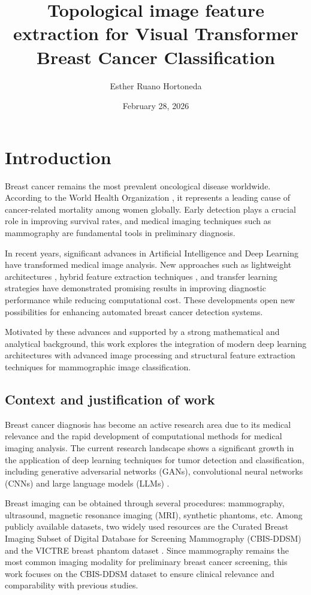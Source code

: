 \documentclass[ENG]{TFUOC}%
\title{Topological image feature extraction for Visual Transformer Breast Cancer Classification}
\author{Esther Ruano Hortoneda}
\date{February 28, 2026}
\begin{document}
\estructura

\tableofcontents

\listoffigures

\listoftables


\chapter{Introduction}

Breast cancer remains the most prevalent oncological disease worldwide. According to the World Health Organization \cite{who_cancer_2024}, it represents a leading cause of cancer-related mortality among women globally. Early detection plays a crucial role in improving survival rates, and medical imaging techniques such as mammography are fundamental tools in preliminary diagnosis.

In recent years, significant advances in Artificial Intelligence and Deep Learning have transformed medical image analysis. New approaches such as lightweight architectures \cite{lightweight}, hybrid feature extraction techniques \cite{hybrid}, and transfer learning strategies \cite{transferLearning} have demonstrated promising results in improving diagnostic performance while reducing computational cost. These developments open new possibilities for enhancing automated breast cancer detection systems.

Motivated by these advances and supported by a strong mathematical and analytical background, this work explores the integration of modern deep learning architectures with advanced image processing and structural feature extraction techniques for mammographic image classification.

\section{Context and justification of work}\label{context}

Breast cancer diagnosis has become an active research area due to its medical relevance and the rapid development of computational methods for medical imaging analysis. The current research landscape shows a significant growth in the application of deep learning techniques for tumor detection and classification, including generative adversarial networks (GANs), convolutional neural networks (CNNs) and large language models (LLMs) \cite{stateOfTheArt}. 

\sloppy Breast imaging can be obtained through several procedures: mammography, ultrasound, magnetic resonance imaging (MRI), synthetic phantoms, etc. Among publicly available datasets, two widely used resources are the Curated Breast Imaging Subset of Digital Database for Screening Mammography (CBIS-DDSM) \cite{cbis_ddsm_dataset} and the VICTRE breast phantom dataset \cite{victre_breast_phantom}. Since mammography remains the most common imaging modality for preliminary breast cancer screening, this work focuses on the CBIS-DDSM dataset to ensure clinical relevance and comparability with previous studies.
\end{document}
